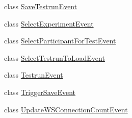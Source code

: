 \begin{DoxyCompactItemize}
\item 
class \hyperlink{class_web_analyzer_1_1_events_1_1_save_testrun_event}{Save\+Testrun\+Event}
\item 
class \hyperlink{class_web_analyzer_1_1_events_1_1_select_experiment_event}{Select\+Experiment\+Event}
\item 
class \hyperlink{class_web_analyzer_1_1_events_1_1_select_participant_for_test_event}{Select\+Participant\+For\+Test\+Event}
\item 
class \hyperlink{class_web_analyzer_1_1_events_1_1_select_testrun_to_load_event}{Select\+Testrun\+To\+Load\+Event}
\item 
class \hyperlink{class_web_analyzer_1_1_events_1_1_testrun_event}{Testrun\+Event}
\item 
class \hyperlink{class_web_analyzer_1_1_events_1_1_trigger_save_event}{Trigger\+Save\+Event}
\item 
class \hyperlink{class_web_analyzer_1_1_events_1_1_update_w_s_connection_count_event}{Update\+W\+S\+Connection\+Count\+Event}
\end{DoxyCompactItemize}
